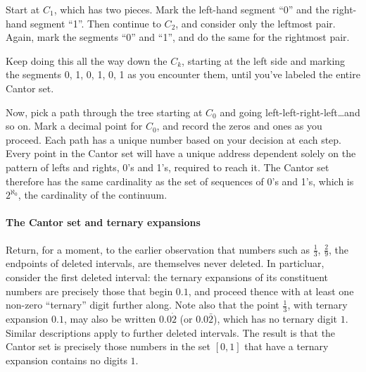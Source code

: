 \documentclass{article}
\begin{document}
Start at $C_1$, which has two pieces.  Mark the left-hand segment ``0'' and the right-hand segment ``1''.  Then continue to $C_2$, 
and consider only the leftmost pair.  Again, mark the segments ``0'' and ``1'', and do the same for the rightmost pair.

Keep doing this all the way down the $C_k$, starting at the left side and marking the segments 0, 1, 0, 1, 0, 1 as you encounter them, 
until you've labeled the entire Cantor set.

Now, pick a path through the tree starting at $C_0$ and going left-left-right-left\ldots and so on.  Mark a decimal point for $C_0$, and 
record the zeros and ones as you proceed.  Each path has a unique number based on your decision at each step.
Every point in the Cantor set will have a unique address dependent solely on the pattern of lefts and rights, 0's and 1's, required to 
reach it.
The Cantor set therefore has the same cardinality as the set of sequences of 0's and 1's, which is $2^{\aleph_0}$, the cardinality of the continuum.

\paragraph{The Cantor set and ternary expansions}
Return, for a moment, to the earlier observation that numbers such as $\frac{1}{3}$, $\frac{2}{9}$, the endpoints of deleted intervals, 
are themselves never deleted.  In particluar, consider the first deleted interval:  the ternary expansions of its constituent numbers are 
precisely those that begin $0.1$, and proceed thence with at least one non-zero ``ternary'' digit further along.  Note 
also that the point $\frac{1}{3}$, with ternary expansion $0.1$, may also be written $0.0\dot{2}$ (or $0.0\bar{2}$), which has no ternary digit $1$.
Similar descriptions apply to further deleted intervals.
The result is that the Cantor set is precisely those numbers in the set 
$[0,1]$ that have a ternary expansion contains no digits $1$.
\end{document}
